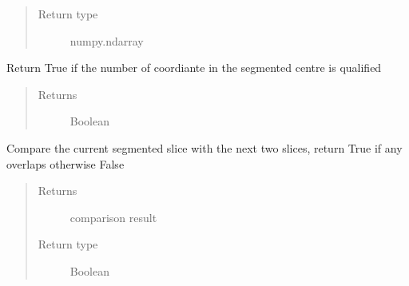 \documentclass[letterpaper,10pt,english]{sphinxmanual}
\begin{document}
\begin{fulllineitems}
\begin{fulllineitems}
\begin{quote}
\begin{description}
\item[{Return type}] \leavevmode
\sphinxAtStartPar
numpy.ndarray

\end{description}\end{quote}

\end{fulllineitems}


\begin{fulllineitems}
\label{\detokenize{AortaGeomReconDisplayModuleLib:AortaSegmenter.AortaSegmenter.__is_new_centre_qualified}}
\sphinxAtStartPar
Return True if the number of coordiante in the segmented centre is qualified
\begin{quote}\begin{description}
\item[{Returns}] \leavevmode
\sphinxAtStartPar
Boolean

\end{description}\end{quote}

\end{fulllineitems}


\begin{fulllineitems}
\label{\detokenize{AortaGeomReconDisplayModuleLib:AortaSegmenter.AortaSegmenter.__is_overlapping}}
\sphinxAtStartPar
Compare the current segmented slice with the next two slices,
return True if any overlaps otherwise False
\begin{quote}\begin{description}
\item[{Returns}] \leavevmode
\sphinxAtStartPar
comparison result

\item[{Return type}] \leavevmode
\sphinxAtStartPar
Boolean

\end{description}\end{quote}


\end{fulllineitems}
\end{fulllineitems}
\end{document}
